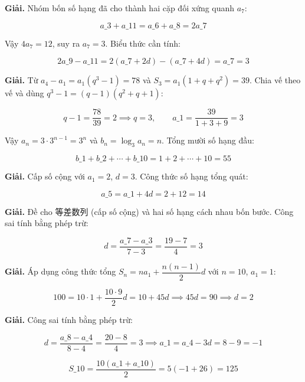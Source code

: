 \documentclass[11pt, a4paper]{article}
\begin{document}
\begin{dapan}[7 — Đáp án B]
\textbf{Giải.} Nhóm bốn số hạng đã cho thành hai cặp đối xứng quanh $a_7$:

$$a\_3 + a\_{11} = a\_6 + a\_8 = 2a\_7$$

Vậy $4a_7 = 12$, suy ra $a_7 = 3$. Biểu thức cần tính:

$$2a\_9 - a\_{11} = 2(a\_7 + 2d) - (a\_7 + 4d) = a\_7 = 3$$
\end{dapan}

\begin{dapan}[8 — Đáp án D]
\textbf{Giải.} Từ $a_4 - a_1 = a_1(q^3 - 1) = 78$ và $S_3 = a_1(1 + q + q^2) = 39$. Chia vế theo vế và dùng $q^3 - 1 = (q - 1)(q^2 + q + 1)$:

$$q - 1 = \frac{78}{39} = 2 \implies q = 3, \qquad a\_1 = \frac{39}{1 + 3 + 9} = 3$$

Vậy $a_n = 3 \cdot 3^{n-1} = 3^n$ và $b_n = \log_3 a_n = n$. Tổng mười số hạng đầu:

$$b\_1 + b\_2 + \cdots + b\_{10} = 1 + 2 + \cdots + 10 = 55$$
\end{dapan}

\begin{dapan}[9 — Đáp án A]
\textbf{Giải.} Cấp số cộng với $a_1 = 2$, $d = 3$. Công thức số hạng tổng quát:

$$a\_5 = a\_1 + 4d = 2 + 12 = 14$$
\end{dapan}

\begin{dapan}[10 — Đáp án A]
\textbf{Giải.} Đề cho 等差数列 (cấp số cộng) và hai số hạng cách nhau bốn bước. Công sai tính bằng phép trừ:

$$d = \frac{a\_7 - a\_3}{7 - 3} = \frac{19 - 7}{4} = 3$$
\end{dapan}

\begin{dapan}[11 — Đáp án A]
\textbf{Giải.} Áp dụng công thức tổng $S_n = na_1 + \dfrac{n(n-1)}{2}d$ với $n = 10$, $a_1 = 1$:

$$100 = 10 \cdot 1 + \frac{10 \cdot 9}{2}d = 10 + 45d \implies 45d = 90 \implies d = 2$$
\end{dapan}

\begin{dapan}[12 — Đáp án D]
\textbf{Giải.} Công sai tính bằng phép trừ:

$$d = \frac{a\_8 - a\_4}{8 - 4} = \frac{20 - 8}{4} = 3 \implies a\_1 = a\_4 - 3d = 8 - 9 = -1$$

$$S\_{10} = \frac{10(a\_1 + a\_{10})}{2} = 5(-1 + 26) = 125$$
\end{dapan}
\end{document}
